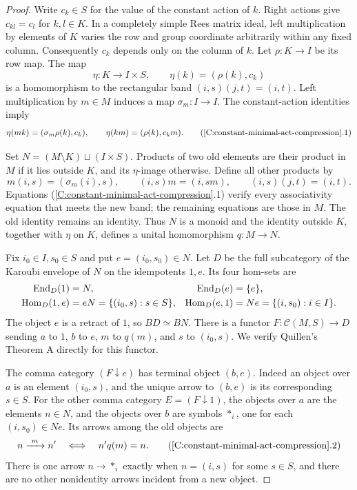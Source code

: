 \begin{proof}
Write $c_k\in S$ for the value of the constant action of $k$.
Right actions give $c_{kl}=c_l$ for $k,l\in K$.  In a completely
simple Rees matrix ideal, left multiplication by elements of $K$
varies the row and group coordinate arbitrarily within any fixed
column.  Consequently $c_k$ depends only on the column of $k$.
Let $\rho:K\to I$ be its row map.  The map
\[
 \eta:K\longrightarrow I\times S,
 \qquad \eta(k)=(\rho(k),c_k)
\]
is a homomorphism to the rectangular band
$(i,s)(j,t)=(i,t)$.  Left multiplication by $m\in M$ induces a
map $\sigma_m:I\to I$.  The constant-action identities imply
\[
 \eta(mk)=(\sigma_m\rho(k),c_k),\qquad
 \eta(km)=(\rho(k),c_km).                         \tag{\ref{C:constant-minimal-act-compression}.1}
\]

Set $N=(M\setminus K)\sqcup(I\times S)$.  Products of two old
elements are their product in $M$ if it lies outside $K$, and its
$\eta$-image otherwise.  Define all other products by
\[
 m(i,s)=(\sigma_m(i),s),\qquad
 (i,s)m=(i,sm),\qquad
 (i,s)(j,t)=(i,t).
\]
Equations (\ref{C:constant-minimal-act-compression}.1) verify every
associativity equation that meets the new band; the remaining
equations are those in $M$.  The old identity remains an identity.
Thus $N$ is a monoid and the identity outside $K$, together with
$\eta$ on $K$, defines a unital homomorphism $q:M\to N$.

Fix $i_0\in I,s_0\in S$ and put $e=(i_0,s_0)\in N$.
Let $D$ be the full subcategory of the Karoubi envelope of $N$
on the idempotents $1,e$.  Its four hom-sets are
\begin{align*}
 \operatorname{End}_D(1)&=N, & \operatorname{End}_D(e)&=\{e\},\\
 \operatorname{Hom}_D(1,e)&=eN=\{(i_0,s):s\in S\}, &
 \operatorname{Hom}_D(e,1)&=Ne=\{(i,s_0):i\in I\}.
\end{align*}
The object $e$ is a retract of $1$, so $BD\simeq BN$.
There is a functor $F:\mathcal C(M,S)\to D$ sending $a$ to $1$,
$b$ to $e$, $m$ to $q(m)$, and $s$ to $(i_0,s)$.
We verify Quillen's Theorem A directly for this functor.

The comma category $(F\downarrow e)$ has terminal object
$(b,e)$.  Indeed an object over $a$ is an element $(i_0,s)$,
and the unique arrow to $(b,e)$ is its corresponding $s\in S$.
For the other comma category $E=(F\downarrow1)$, the objects
over $a$ are the elements $n\in N$, and the objects over $b$
are symbols $*_i$, one for each $(i,s_0)\in Ne$.  Its arrows
among the old objects are
\[
 n\xrightarrow{\ m\ }n'\quad\Longleftrightarrow\quad n'q(m)=n.
                                                               \tag{\ref{C:constant-minimal-act-compression}.2}
\]
There is one arrow $n\to *_i$ exactly when $n=(i,s)$ for some
$s\in S$, and there are no other nonidentity arrows incident
from a new object.


\end{proof}

